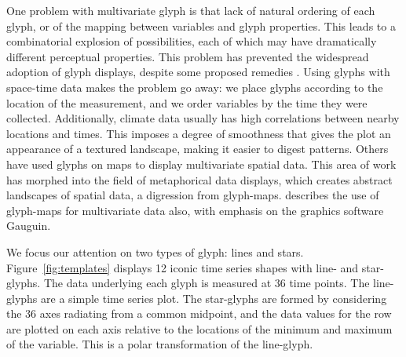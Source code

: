 \documentclass[oneside]{article}
\begin{document}

One problem with multivariate glyph is that lack of natural ordering of each glyph, or of the mapping between variables and glyph properties. This leads to a combinatorial explosion of possibilities, each of which may have dramatically different perceptual properties. This problem has prevented the widespread adoption of glyph displays, despite some proposed remedies \citep{kleiner:1981,hurley:2010}. Using glyphs with space-time data makes the problem go away: we place glyphs according to the location of the measurement, and we order variables by the time they were collected. Additionally, climate data usually has high correlations between nearby locations and times. This imposes a degree of smoothness that gives the plot an appearance of a textured  landscape, making it easier to digest patterns. Others \citet{pickett:1988} have used glyphs on maps to display multivariate spatial data. This area of work has morphed into the field of metaphorical data displays, which creates abstract landscapes of spatial data, a digression from glyph-maps. \citet{gribov:2006} describes the use of glyph-maps for multivariate data also, with emphasis on the graphics software Gauguin.

We focus our attention on two types of glyph: lines and stars. Figure~\ref{fig:templates} displays 12 iconic time series shapes with line- and star-glyphs. The data underlying each glyph is measured at 36 time points. The line-glyphs are a simple time series plot. The star-glyphs are formed by considering the 36 axes radiating from a common midpoint, and the data values for the row are plotted on each axis relative to the locations of the minimum and maximum of the variable. This is a polar transformation of the line-glyph.
\end{document}
